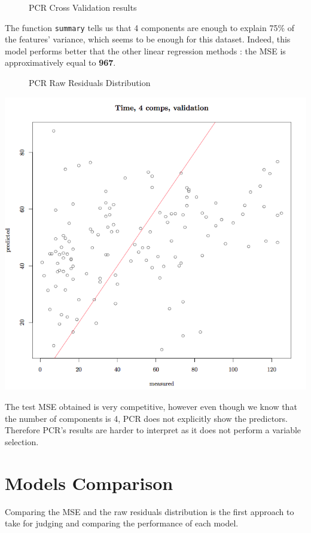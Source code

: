 \documentclass[]{report}
\newcommand{\inputtikz}[2]{%
	\scalebox{#1}{}  
}
\begin{document}
\begin{figure}[!h]
	\centering
	\inputtikz{0.5}{Figures/pcr_cv.tex}
	\caption{PCR Cross Validation results}
	\label{fig:pcr_cv}
\end{figure}

The function \texttt{summary} tells us that 4 components are enough to explain 75\% of the features' variance, which seems to be enough for this dataset. Indeed, this model performs better that the other linear regression methods : the MSE is approximatively equal to \textbf{967}. 

\begin{figure}[!h]
	\centering
	\inputtikz{0.5}{Figures/pcr_hist.tex}
	\caption{PCR Raw Residuals Distribution}
	\label{fig:pcr_hist}
\end{figure}

\begin{center}
	\includegraphics[width=0.8\linewidth]{Figures/pcr_predicted}
	\label{fig:pcr_predicted}
\end{center}
The test MSE obtained is very competitive, however even though we know that the number of components is 4, PCR does not explicitly show the predictors. Therefore PCR's results are harder to interpret as it does not perform a variable selection.

\section{Models Comparison}
Comparing the MSE and the raw residuals distribution is the first approach to take for judging and comparing the performance of each model.\\
\end{document}
